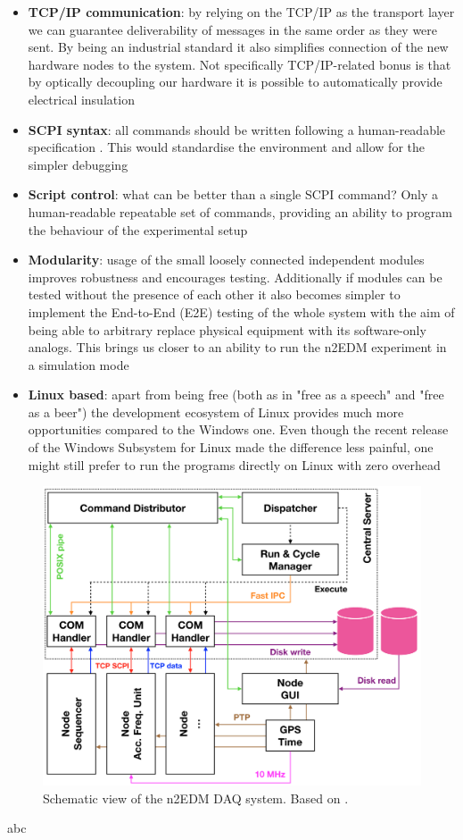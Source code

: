 \begin{itemize}
	\item \textbf{TCP/IP communication}: by relying on the TCP/IP as the transport layer we can guarantee deliverability of messages in the same order as they were sent. By being an industrial standard it also simplifies connection of the new hardware nodes to the system. Not specifically TCP/IP-related bonus is that by optically decoupling our hardware it is possible to automatically provide electrical insulation
	\item \textbf{SCPI syntax}: all commands should be written following a human-readable specification \cite{SCPIConsortium1999}. This would standardise the environment and allow for the simpler debugging
	\item \textbf{Script control}: what can be better than a single SCPI command? Only a human-readable repeatable set of commands, providing an ability to program the behaviour of the experimental setup
	\item \textbf{Modularity}: usage of the small loosely connected independent modules improves robustness and encourages testing. Additionally if modules can be tested without the presence of each other it also becomes simpler to implement the End-to-End (E2E) testing of the whole system with the aim of being able to arbitrary replace physical equipment with its software-only analogs. This brings us closer to an ability to run the n2EDM experiment in a simulation mode
	\item \textbf{Linux based}: apart from being free (both as in "free as a speech" and "free as a beer") the development ecosystem of Linux provides much more opportunities compared to the Windows one. Even though the recent release \cite{Loewen2019} of the Windows Subsystem for Linux made the difference less painful, one might still prefer to run the programs directly on Linux with zero overhead
\end{itemize}%
\begin{figure}[h]
	\centering
	\includegraphics[width=.96\textwidth]{img/daq_schema}
	\caption{Schematic view of the n2EDM DAQ system. Based on \cite{Bison2018}.}
\end{figure}

abc